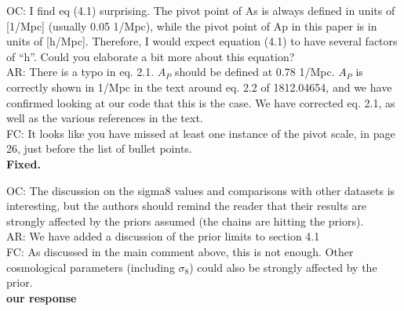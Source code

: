 \documentclass[12pt]{article}
\begin{document}
\hrulefill \newline

OC: I find eq (4.1) surprising. The pivot point of As is always defined in units of [1/Mpc] (usually 0.05 1/Mpc), while the pivot point of Ap in this paper is in units of [h/Mpc]. Therefore, I would expect equation (4.1) to have several factors of “h”. Could you elaborate a bit more about this equation?\\

AR: There is a typo in eq. 2.1. $A_P$ should be defined at 0.78 1/Mpc. $A_P$ is correctly shown in 1/Mpc in the text around eq. 2.2 of 1812.04654, and we have confirmed looking at our code that this is the case. We have corrected eq. 2.1, as well as the various references in the text.\\

FC: It looks like you have missed at least one instance of the pivot scale, in page 26, just before the list of bullet points.\\

\textbf{Fixed.}\\

\hrulefill \newline

OC: The discussion on the sigma8 values and comparisons with other datasets is interesting, but the authors should remind the reader that their results are strongly affected by the priors assumed (the chains are hitting the priors).\\

AR: We have added a discussion of the prior limits to section 4.1\\

FC: As discussed in the main comment above, this is not enough. Other cosmological parameters (including $\sigma_8$) could also be strongly affected by the prior.\\

\textbf{our response}\\

\hrulefill \newline
\end{document}
